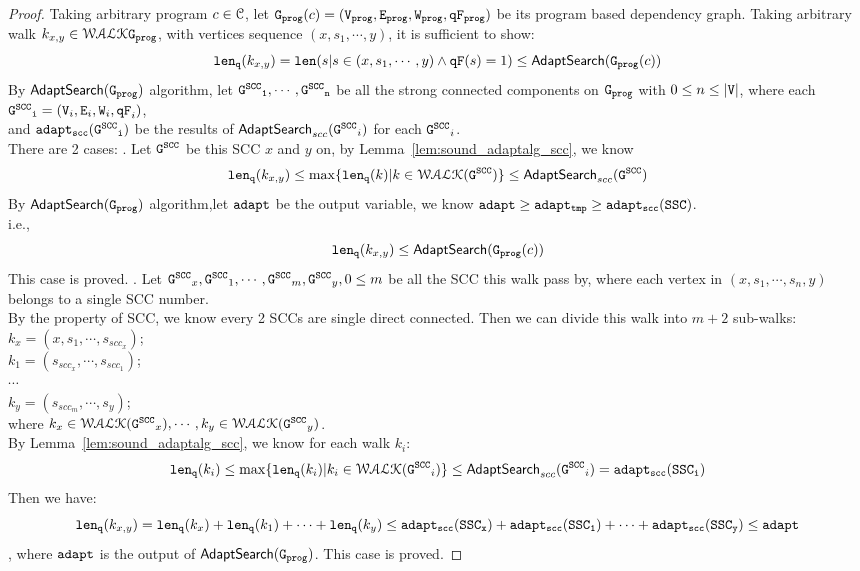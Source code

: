 \begin{proof}
  Taking arbitrary program $c \in \mathcal{C}$, let $\mathtt{{G_{prog}}}(c) = (\mathtt{{V_{prog}}}, \mathtt{{E_{prog}}}, \mathtt{{W_{prog}}}, \mathtt{{qF_{prog}}})$ be its 
  program based dependency graph.
  Taking arbitrary walk $k_{x,y} \in \mathcal{WALK}{\mathtt{{G_{prog}}}}$, with vertices sequence
  $(x, s_1, \cdots, y)$, it is sufficient to show:
  \[
    \mathtt{len}_{\tt q}(k_{x,y}) = \mathtt{len}(s | s \in (x, s_1, \cdots, y) \land \mathtt{qF}(s) = 1) \leq \mathsf{AdaptSearch}(\mathtt{{G_{prog}}}(c))
  \]
  By $\mathsf{AdaptSearch}(\mathtt{{G_{prog}}})$ algorithm, let $\mathtt{\mathtt{G^{SCC}}_1}, \cdots, \mathtt{\mathtt{G^{SCC}}_n}$ be all the strong connected components on $\mathtt{{G_{prog}}}$ with $0 \leq n \leq |\mathtt{V}|$,
  where each $\mathtt{\mathtt{G^{SCC}}_i} = (\mathtt{V}_i, \mathtt{E}_i, \mathtt{W}_i, \mathtt{qF}_i)$,
  \\
  and $\mathtt{adapt_{scc}(\mathtt{G^{SCC}}_i)}$ be the results of $\mathsf{AdaptSearch}_{scc}(\mathtt{G^{SCC}}_i)$ for each $\mathtt{G^{SCC}}_i$.
  \\
  There are 2 cases:
  .
  Let  $\mathtt{G^{SCC}}$ be this SCC $x$ and $y$ on, by Lemma~\ref{lem:sound_adaptalg_scc}, we know
  \[
    \mathtt{len}_{\tt q}(k_{x,y}) \leq \max\{\mathtt{len}_{\tt q}(k) | k \in \mathcal{WALK}(\mathtt{G^{SCC}})\} \leq \mathsf{AdaptSearch}_{scc}(\mathtt{G^{SCC}})
  \]
%
By $\mathsf{AdaptSearch}(\mathtt{{G_{prog}}})$ algorithm,let $\mathtt{adapt}$ be the output variable,
we know $\mathtt{adapt} \geq \mathtt{adapt_{tmp}} \geq  \mathtt{adapt_{scc}(SSC)} $.
\\
i.e., 
\[
  \mathtt{len}_{\tt q}(k_{x,y}) \leq \mathsf{AdaptSearch}(\mathtt{{G_{prog}}}(c)) 
  \]
This case is proved.
%
%
.
Let $\mathtt{G^{SCC}}_x, \mathtt{G^{SCC}}_1, \cdots, \mathtt{G^{SCC}}_m, \mathtt{G^{SCC}}_y, 0 \leq m$ be all the SCC this walk pass by, where each vertex in 
$(x, s_1, \cdots, s_n, y) $ belongs to a single SCC number. 
\\
By the property of SCC, we know every 2 SCCs are single direct connected. Then we can divide this walk into $m+2$ sub-walks:
\\
$k_x = (x, s_1, \cdots, s_{scc_x})$;
\\
$k_1 = (s_{scc_x}, \cdots, s_{scc_1})$;
\\
$\cdots$
\\
$k_y = (s_{scc_m}, \cdots, s_y)$;
\\
where $k_x \in \mathcal{WALK}(\mathtt{G^{SCC}}_x), \cdots, k_y \in \mathcal{WALK}(\mathtt{G^{SCC}}_y)$.
\\
By Lemma~\ref{lem:sound_adaptalg_scc}, we know for each walk $k_i$:
\[ \mathtt{len}_{\tt q}(k_i) \leq \max\{\mathtt{len}_{\tt q}(k_i) | k_i \in \mathcal{WALK}(\mathtt{G^{SCC}}_i)\} \leq \mathsf{AdaptSearch}_{scc}(\mathtt{G^{SCC}}_i) = \mathtt{adapt_{scc}(SSC_i)} \]
%
Then we have:
\[ 
  \mathtt{len}_{\tt q}(k_{x,y}) = \mathtt{len}_{\tt q}(k_x) + \mathtt{len}_{\tt q}(k_1) + \cdots + \mathtt{len}_{\tt q}(k_y) \leq 
  \mathtt{adapt_{scc}(SSC_x)} + \mathtt{adapt_{scc}(SSC_1)}  + \cdots + \mathtt{adapt_{scc}(SSC_y)}
  \leq \mathtt{adapt}
  \]
, where $\mathtt{adapt}$ is the output of $\mathsf{AdaptSearch}(\mathtt{{G_{prog}}})$.
This case is proved.
\end{proof}

